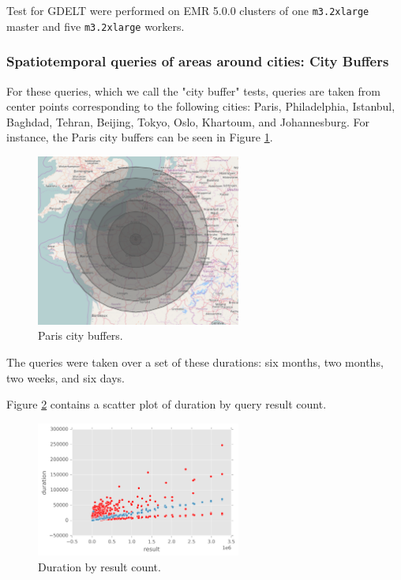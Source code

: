 Test for GDELT were performed on EMR 5.0.0 clusters of one \texttt{m3.2xlarge} master and five \texttt{m3.2xlarge} workers.

\subsubsection{Spatiotemporal queries of areas around cities: City Buffers}

For these queries, which we call the "city buffer" tests, queries are taken from center points corresponding to the following cities:
Paris, Philadelphia, Istanbul, Baghdad, Tehran, Beijing, Tokyo, Oslo, Khartoum, and Johannesburg.
For instance, the Paris city buffers can be seen in Figure \ref{paris}.

\begin{figure}[h!tb]
  \centering
  \includegraphics[width=0.60\textwidth]{../docs/img/gdelt/paris-city-buffers.png}
  \caption{Paris city buffers.}
  \label{paris}
\end{figure}

The queries were taken over a set of these durations: six months, two months, two weeks, and six days.

Figure \ref{durationbyresult} contains a scatter plot of duration by query result count.

\begin{figure}[h!tb]
  \centering
  \includegraphics[width=0.60\textwidth]{../docs/img/gdelt/gdelt-result-over-duration.png}
  \caption{Duration by result count.}
  \label{durationbyresult}
\end{figure}

